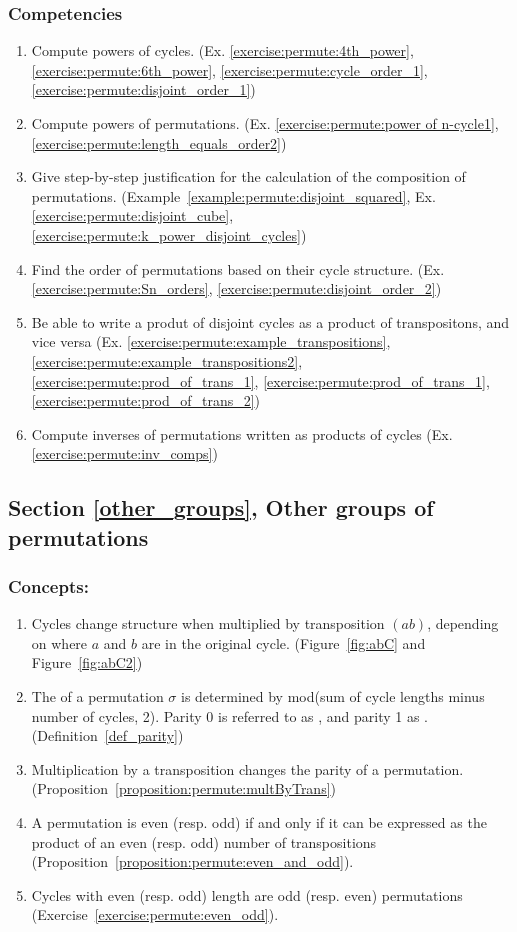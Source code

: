 \subsubsection*{Competencies}
\begin{enumerate}
\item
Compute powers of cycles. (Ex. \ref{exercise:permute:4th_power}, \ref{exercise:permute:6th_power}, \ref{exercise:permute:cycle_order_1}, \ref{exercise:permute:disjoint_order_1})
\item
Compute powers of permutations. (Ex. \ref{exercise:permute:power of n-cycle1}, \ref{exercise:permute:length_equals_order2})
\item
Give step-by-step justification for the calculation of the composition of permutations. (Example~\ref{example:permute:disjoint_squared},  Ex. \ref{exercise:permute:disjoint_cube}, \ref{exercise:permute:k_power_disjoint_cycles})
\item
Find the order of permutations based on their cycle structure. (Ex. \ref{exercise:permute:Sn_orders}, \ref{exercise:permute:disjoint_order_2})
\item
Be able to write a produt of disjoint cycles as a product of transpositons, and vice versa (Ex. \ref{exercise:permute:example_transpositions}, \ref{exercise:permute:example_transpositions2}, \ref{exercise:permute:prod_of_trans_1}, \ref{exercise:permute:prod_of_trans_1}, \ref{exercise:permute:prod_of_trans_2})
\item
Compute inverses of permutations written as products of cycles (Ex. \ref{exercise:permute:inv_comps})
\end{enumerate}


\subsection*{Section \ref{other_groups}, Other groups of permutations}
\subsubsection*{Concepts:}
\begin{enumerate}
\item 
Cycles change structure when  multiplied by transposition $(ab)$, depending on where $a$ and $b$ are in the original cycle. (Figure~\ref{fig:abC} and  Figure~\ref{fig:abC2})
\item
The  of a permutation $\sigma$ is determined by mod(sum of cycle lengths minus number of cycles, 2). Parity 0 is referred to as , and parity 1 as . (Definition~\ref{def_parity})
\item
Multiplication by a transposition changes the parity of a permutation. (Proposition~\ref{proposition:permute:multByTrans})
\item
A permutation is even (resp. odd) if and only if it can be expressed as the product of an even (resp. odd) number of transpositions (Proposition~\ref{proposition:permute:even_and_odd}).
\item
Cycles with even (resp. odd) length are odd (resp. even) permutations (Exercise~\ref{exercise:permute:even_odd}).
\end{enumerate}


